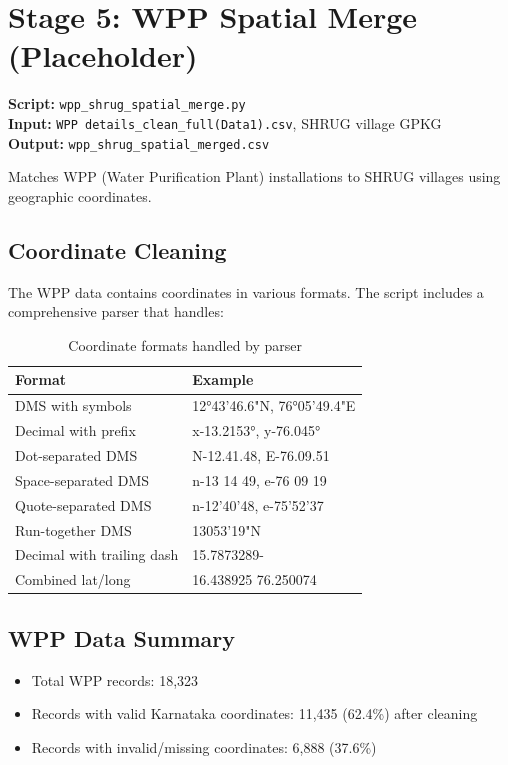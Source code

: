 \documentclass[11pt,a4paper]{article}
\begin{document}
\section{Stage 5: WPP Spatial Merge (Placeholder)}

\textbf{Script:} \texttt{wpp\_shrug\_spatial\_merge.py}\\
\textbf{Input:} \texttt{WPP details\_clean\_full(Data1).csv}, SHRUG village GPKG\\
\textbf{Output:} \texttt{wpp\_shrug\_spatial\_merged.csv}

Matches WPP (Water Purification Plant) installations to SHRUG villages using geographic coordinates.

\subsection{Coordinate Cleaning}
The WPP data contains coordinates in various formats. The script includes a comprehensive parser that handles:

\begin{table}[h]
\centering
\small
\begin{tabular}{ll}
\toprule
\textbf{Format} & \textbf{Example} \\
\midrule
DMS with symbols & 12°43'46.6"N, 76°05'49.4"E \\
Decimal with prefix & x-13.2153°, y-76.045° \\
Dot-separated DMS & N-12.41.48, E-76.09.51 \\
Space-separated DMS & n-13 14 49, e-76 09 19 \\
Quote-separated DMS & n-12'40'48, e-75'52'37 \\
Run-together DMS & 13053'19"N \\
Decimal with trailing dash & 15.7873289- \\
Combined lat/long & 16.438925 76.250074 \\
\bottomrule
\end{tabular}
\caption{Coordinate formats handled by parser}
\end{table}

\subsection{WPP Data Summary}
\begin{itemize}
    \item Total WPP records: 18,323
    \item Records with valid Karnataka coordinates: 11,435 (62.4\%) after cleaning
    \item Records with invalid/missing coordinates: 6,888 (37.6\%)
\end{itemize}
\end{document}
